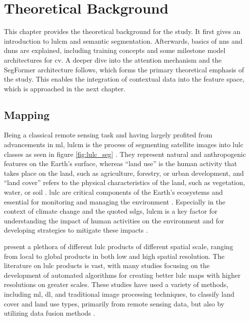 \chapter{Theoretical Background}
\label{sec:theory}

This chapter provides the theoretical background for the study. It first gives an introduction to \gls{lulcm} and semantic segmentation. Afterwards, basics of \glspl{nn} and \glspl{dnn} are explained, including training concepts and some milestone model architectures for \gls{cv}. A deeper dive into the attention mechanism and the SegFormer architecture follows, which forms the primary theoretical emphasis of the study. This enables the integration of contextual data into the feature space, which is approached in the next chapter.

\section{ Mapping}

Being a classical remote sensing task and having largely profited from advancements in \gls{ml}, \gls{lulcm} is the process of segmenting satellite images into \gls{lulc} classes as seen in figure \ref{fig:lulc_seg} \autocite{Li.Cai.ea2024}. They represent natural and anthropogenic features on the Earth's surface, whereas \enquote{land use} is the human activity that takes place on the land, such as agriculture, forestry, or urban development, and \enquote{land cover} refers to the physical characteristics of the land, such as vegetation, water, or soil \autocite{Zhang.Li2022}. \gls{lulc} are critical components of the Earth's ecosystems and essential for monitoring and managing the environment \autocite{Zhao.Tu.ea2023}. Especially in the context of climate change and the quoted \glspl{sdg}, \gls{lulcm} is a key factor for understanding the impact of human activities on the environment and for developing strategies to mitigate these impacts \autocite{Moharram.Sundaram2023}.

\textcite{Wang.Sun.ea2023} present a plethora of different \gls{lulc} products of different spatial scale, ranging from local to global products in both low and high spatial resolution. The literature on \gls{lulc} products is vast, with many studies focusing on the development of automated algorithms for creating better \gls{lulc} maps with higher resolutions on greater scales. These studies have used a variety of methods, including \gls{ml}, \gls{dl}, and traditional image processing techniques, to classify land cover and land use types, primarily from remote sensing data, but also by utilizing data fusion methods \autocite{Alhassan.Henry.ea2020,Comber.Wulder2019,Rangel.Terven.ea2024,Wang.Sun.ea2023,Yu.Liang.ea2014}.

